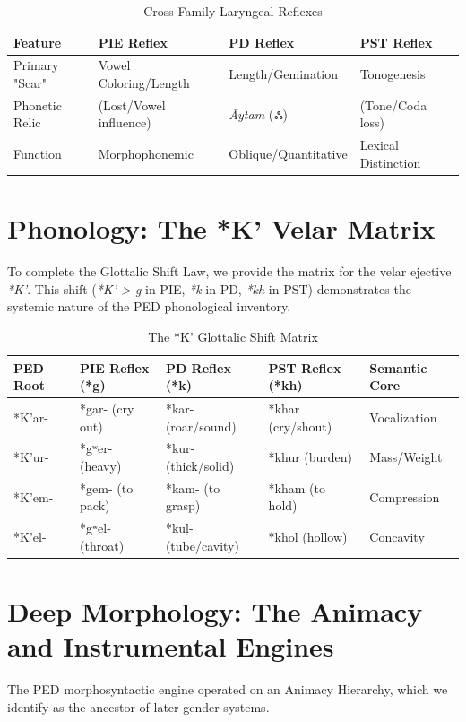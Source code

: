 \documentclass[11pt,a4paper]{article}
\begin{document}
\begin{table}[h]
\centering
\begin{tabular}{@{}llll@{}}
\toprule
\textbf{Feature} & \textbf{PIE Reflex} & \textbf{PD Reflex} & \textbf{PST Reflex} \\ \midrule
Primary "Scar" & Vowel Coloring/Length & Length/Gemination & Tonogenesis \\
Phonetic Relic & (Lost/Vowel influence) & \textit{\={A}ytam} (ஃ) & (Tone/Coda loss) \\
Function & Morphophonemic & Oblique/Quantitative & Lexical Distinction \\ \bottomrule
\end{tabular}
\caption{Cross-Family Laryngeal Reflexes}
\end{table}

\section{Phonology: The *K' Velar Matrix}
To complete the Glottalic Shift Law, we provide the matrix for the velar ejective \textit{*K'}. This shift (\textit{*K' > g} in PIE, \textit{*k} in PD, \textit{*kh} in PST) demonstrates the systemic nature of the PED phonological inventory.

\begin{table}[h]
\centering
\begin{tabular}{@{}lllll@{}}
\toprule
\textbf{PED Root} & \textbf{PIE Reflex (*g)} & \textbf{PD Reflex (*k)} & \textbf{PST Reflex (*kh)} & \textbf{Semantic Core} \\ \midrule
*K'ar- & *gar- (cry out) & *kar- (roar/sound) & *khar (cry/shout) & Vocalization \\
*K'ur- & *gʷer- (heavy) & *kur- (thick/solid) & *khur (burden) & Mass/Weight \\
*K'em- & *gem- (to pack) & *kam- (to grasp) & *kham (to hold) & Compression \\
*K'el- & *gʷel- (throat) & *ku\d{l}- (tube/cavity) & *khol (hollow) & Concavity \\ \bottomrule
\end{tabular}
\caption{The *K' Glottalic Shift Matrix}
\end{table}

\section{Deep Morphology: The Animacy and Instrumental Engines}
The PED morphosyntactic engine operated on an Animacy Hierarchy, which we identify as the ancestor of later gender systems.
\end{document}
